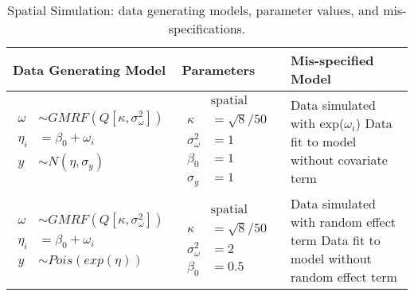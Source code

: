 \begin{table}[h]
    \caption{Spatial Simulation: data generating models, parameter values, and mis-specifications.}
    \begin{tabular}{llp{8cm}}
    \toprule
    Data Generating Model & Parameters & Mis-specified Model \\
    \hline
    {$\!\begin{aligned}
    \omega &\sim GMRF(Q[\kappa, \sigma^{2}_{\omega}]) \\
    \eta_{i} &= \beta_{0} + \omega_{i} \\
    y &\sim N(\eta, \sigma_{y})
    \end{aligned}$}
    &
    {$\!\begin{aligned}
    &\text{spatial range = 50} \\
    \kappa &= \sqrt{8}/50\\
    \sigma^{2}_{\omega} &= 1\\
    \beta_{0} &= 1\\
    \sigma_{y} &= 1
    \end{aligned}$}
    &
    Data simulated with exp($\omega_{i}$) \newline
    Data fit to model without covariate term\\
    \hline
    {$\!\begin{aligned}
    \omega &\sim GMRF(Q[\kappa, \sigma^{2}_{\omega}]) \\
    \eta_{i} &= \beta_{0} + \omega_{i} \\
    y &\sim Pois(exp(\eta)) 
    \end{aligned}$}
    &
    {$\!\begin{aligned}
    &\text{spatial range = 50} \\
    \kappa &= \sqrt{8}/50\\
    \sigma^{2}_{\omega} &= 2\\
    \beta_{0} &= 0.5
    \end{aligned}$}
    &
    Data simulated with random effect term \newline
    Data fit to model without random effect term\\
    
    \bottomrule
    \end{tabular}
    \end{table}